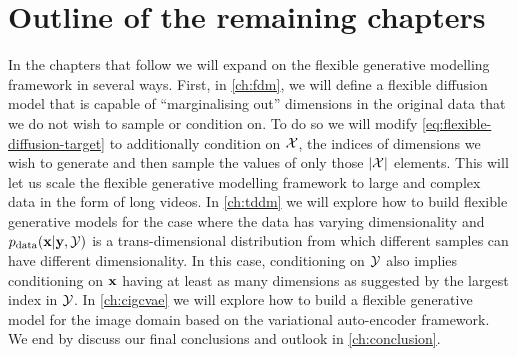 \section{Outline of the remaining chapters}
In the chapters that follow we will expand on the flexible generative modelling framework in several ways. First, in \cref{ch:fdm}, we will define a flexible diffusion model that is capable of ``marginalising out'' dimensions in the original data that we do not wish to sample or condition on. To do so we will modify \cref{eq:flexible-diffusion-target} to additionally condition on ${\mathcal{X}}$, the indices of dimensions we wish to generate and then sample the values of only those $|{\mathcal{X}}|$ elements. This will let us scale the flexible generative modelling framework to large and complex data in the form of long videos. In \cref{ch:tddm} we will explore how to build flexible generative models for the case where the data has varying dimensionality and $p_{\rm{data}}({\mathbf{x}} | {\mathbf{y}}, {\mathcal{Y}})$ is a trans-dimensional distribution from which different samples can have different dimensionality. In this case, conditioning on ${\mathcal{Y}}$ also implies conditioning on ${\mathbf{x}}$ having at least as many dimensions as suggested by the largest index in ${\mathcal{Y}}$. In \cref{ch:cigcvae} we will explore how to build a flexible generative model for the image domain based on the variational auto-encoder framework. We end by discuss our final conclusions and outlook in \cref{ch:conclusion}.
